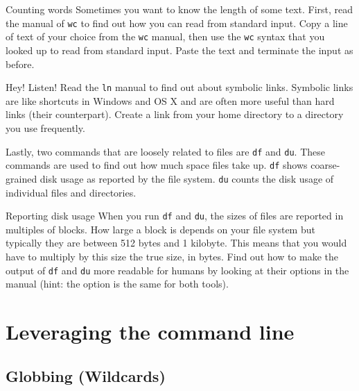 \documentclass{TheAlternativeCourse}
\begin{document}
\begin{exercisebox}{Counting words}
    Sometimes you want to know the length of some text. First, read the manual
    of \texttt{wc} to find out how you can read from standard input. Copy a
    line of text of your choice from the \texttt{wc} manual, then use the
    \texttt{wc} syntax that you looked up to read from standard input. Paste
    the text and terminate the input as before.
\end{exercisebox}


\begin{exercisebox}{Hey! Listen!}
    Read the \texttt{ln} manual to find out about symbolic links. Symbolic
    links are like shortcuts in Windows and OS X and are often more useful than
    hard links (their counterpart). Create a link from your home directory to a
    directory you use frequently.
\end{exercisebox}

Lastly, two commands that are loosely related to files are \texttt{df} and
\texttt{du}. These commands are used to find out how much space files take up.
\texttt{df} shows coarse-grained disk usage as reported by the file system.
\texttt{du} counts the disk usage of individual files and directories.

\begin{exercisebox}{Reporting disk usage}
    When you run \texttt{df} and \texttt{du}, the sizes of files are reported
    in multiples of blocks. How large a block is depends on your file system
    but typically they are between 512 bytes and 1 kilobyte. This means that
    you would have to multiply by this size the true size, in bytes. Find out
    how to make the output of \texttt{df} and \texttt{du} more readable for
    humans by looking at their options in the manual (hint: the option is the
    same for both tools).
\end{exercisebox}

\section{Leveraging the command line}

\subsection{Globbing (Wildcards)}
\end{document}
